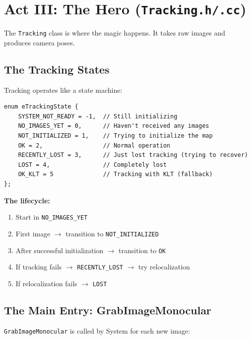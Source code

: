 \section{Act III: The Hero (\texttt{Tracking.h/.cc})}

The \texttt{Tracking} class is where the magic happens. It takes raw images and produces camera poses.

\subsection{The Tracking States}

Tracking operates like a state machine:

\begin{lstlisting}[caption={Tracking states}]
enum eTrackingState {
    SYSTEM_NOT_READY = -1,  // Still initializing
    NO_IMAGES_YET = 0,      // Haven't received any images
    NOT_INITIALIZED = 1,    // Trying to initialize the map
    OK = 2,                 // Normal operation
    RECENTLY_LOST = 3,      // Just lost tracking (trying to recover)
    LOST = 4,               // Completely lost
    OK_KLT = 5              // Tracking with KLT (fallback)
};
\end{lstlisting}

\textbf{The lifecycle:}
\begin{enumerate}
    \item Start in \texttt{NO\_IMAGES\_YET}
    \item First image $\rightarrow$ transition to \texttt{NOT\_INITIALIZED}
    \item After successful initialization $\rightarrow$ transition to \texttt{OK}
    \item If tracking fails $\rightarrow$ \texttt{RECENTLY\_LOST} $\rightarrow$ try relocalization
    \item If relocalization fails $\rightarrow$ \texttt{LOST}
\end{enumerate}

\subsection{The Main Entry: GrabImageMonocular}

\texttt{GrabImageMonocular} is called by System for each new image:

